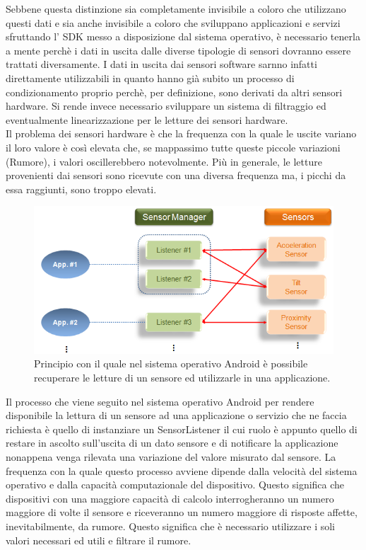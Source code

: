 Sebbene questa distinzione sia completamente invisibile a coloro che utilizzano questi dati e sia anche invisibile a coloro che sviluppano applicazioni e servizi sfruttando l' SDK messo a disposizione dal sistema operativo, è necessario tenerla a mente perchè i dati in uscita dalle diverse tipologie di sensori dovranno essere trattati diversamente. 
I dati in uscita dai sensori software sarnno infatti direttamente utilizzabili in quanto hanno già subito un processo di condizionamento proprio perchè, per definizione, sono derivati da altri sensori hardware.
Si rende invece necessario sviluppare un sistema di filtraggio ed eventualmente linearizzazione per le letture dei sensori hardware.\\
Il problema dei sensori hardware è che la frequenza con la quale le  uscite variano il loro valore è così elevata che, se mappassimo tutte queste piccole variazioni (Rumore), i valori oscillerebbero notevolmente. Più in generale, le letture provenienti dai sensori sono ricevute con una diversa frequenza ma, i picchi da essa raggiunti, sono troppo elevati.
\begin{figure}
	\begin{center}
		\includegraphics[width=0.9\columnwidth]{images/sensor_listener}
	\end{center}
	\caption{Principio con il quale nel sistema operativo Android è possibile recuperare le letture di un sensore ed utilizzarle in una applicazione. \cite{developer:android}}
	\label{fig:sensor_listener}
\end{figure}
Il processo che viene seguito nel sistema operativo Android per rendere disponibile la lettura di un sensore ad una applicazione o servizio che ne faccia richiesta è quello di instanziare un SensorListener il cui ruolo è appunto quello di restare in ascolto sull'uscita di un dato sensore e di notificare la applicazione nonappena venga rilevata una variazione del valore misurato dal sensore. La frequenza con la quale questo processo avviene dipende dalla velocità del sistema operativo e dalla capacità computazionale del dispositivo. Questo significa che dispositivi con una maggiore capacità di calcolo interrogheranno un numero maggiore di volte il sensore e riceveranno un numero maggiore di risposte affette, inevitabilmente, da rumore. Questo significa che è necessario utilizzare i soli valori necessari ed utili e filtrare il rumore.\\
